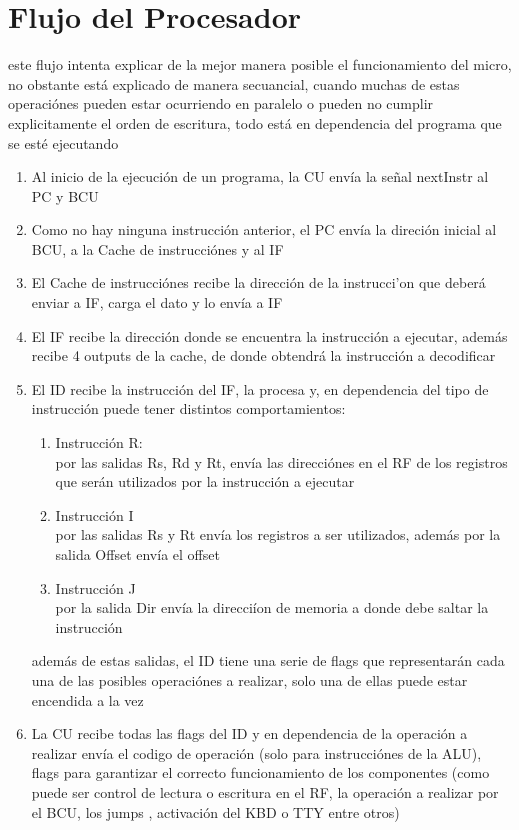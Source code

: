 \documentclass{article}
\begin{document}
    \section{Flujo del Procesador}
        este flujo intenta explicar de la mejor manera posible el funcionamiento del micro, no obstante est\'a explicado de manera secuancial, cuando muchas de estas operaci\'ones pueden estar ocurriendo en paralelo
        o pueden no cumplir explicitamente el orden de escritura, todo est\'a en dependencia del programa que se est\'e ejecutando
        \begin{enumerate}
            \item Al inicio de la ejecuci\'on de un programa, la CU env\'ia la se\~nal nextInstr al PC y BCU
            \item Como no hay ninguna instrucci\'on anterior, el PC env\'ia la direci\'on inicial al BCU, a la Cache de instrucci\'ones y al IF
            \item El Cache de instrucci\'ones recibe la direcci\'on de la instrucci'on que deber\'a enviar a IF, carga el dato y lo env\'ia a IF 
            \item El IF recibe la direcci\'on donde se encuentra la instrucci\'on a ejecutar, adem\'as recibe 4 outputs de la cache, de donde obtendr\'a la instrucci\'on a decodificar
            \item El ID recibe la instrucci\'on del IF, la procesa y, en dependencia del tipo de instrucci\'on puede tener distintos comportamientos:
            \begin{enumerate}
                \item Instrucci\'on R:\\
                por las salidas Rs, Rd y Rt, env\'ia las direcci\'ones en el RF de los registros que ser\'an utilizados por la instrucci\'on a ejecutar
                \item Instrucci\'on I\\
                por las salidas Rs y Rt env\'ia los registros a ser utilizados, adem\'as por la salida Offset env\'ia el offset
                \item Instrucci\'on J\\
                por la salida Dir env\'ia la direcci\'ion de memoria a donde debe saltar la instrucci\'on
                
            \end{enumerate}
                adem\'as de estas salidas, el ID tiene una serie de flags que representar\'an cada una de las posibles operaci\'ones a realizar,
                solo una de ellas puede estar encendida a la vez 
            \item La CU recibe todas las flags del ID y en dependencia de la operaci\'on a realizar env\'ia el codigo de operaci\'on (solo para instrucci\'ones de la ALU),
            flags para garantizar el correcto funcionamiento de los componentes (como puede ser control de lectura o escritura en el RF, la operaci\'on a realizar por el BCU, los jumps
            , activaci\'on del KBD o TTY entre otros)


\end{enumerate}
\end{document}

